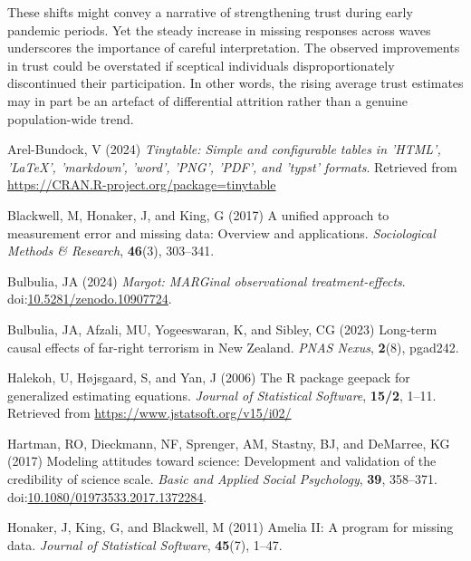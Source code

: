\documentclass[
  single column]{article}
\newlength{\cslhangindent}
\newenvironment{CSLReferences}[2] %
 {\begin{list}{}{%
  \setlength{\itemindent}{0pt}
  \setlength{\leftmargin}{0pt}
  \setlength{\parsep}{0pt}
  \ifodd #1
   \setlength{\leftmargin}{\cslhangindent}
   \setlength{\itemindent}{-1\cslhangindent}
  \fi
  \setlength{\itemsep}{#2\baselineskip}}}
 {\end{list}}
\begin{document}
These shifts might convey a narrative of strengthening trust during
early pandemic periods. Yet the steady increase in missing responses
across waves underscores the importance of careful interpretation. The
observed improvements in trust could be overstated if sceptical
individuals disproportionately discontinued their participation. In
other words, the rising average trust estimates may in part be an
artefact of differential attrition rather than a genuine population-wide
trend.

\newpage{}

\label{refs}
\begin{CSLReferences}{1}{0}
Arel-Bundock, V (2024) \emph{Tinytable: Simple and configurable tables
in 'HTML', 'LaTeX', 'markdown', 'word', 'PNG', 'PDF', and 'typst'
formats}. Retrieved from
\url{https://CRAN.R-project.org/package=tinytable}

Blackwell, M, Honaker, J, and King, G (2017) A unified approach to
measurement error and missing data: Overview and applications.
\emph{Sociological Methods \& Research}, \textbf{46}(3), 303--341.

Bulbulia, JA (2024) \emph{Margot: MARGinal observational
treatment-effects}.
doi:\href{https://doi.org/10.5281/zenodo.10907724}{10.5281/zenodo.10907724}.

Bulbulia, JA, Afzali, MU, Yogeeswaran, K, and Sibley, CG (2023)
Long-term causal effects of far-right terrorism in {N}ew {Z}ealand.
\emph{PNAS Nexus}, \textbf{2}(8), pgad242.

Halekoh, U, Højsgaard, S, and Yan, J (2006) The {R} package geepack for
generalized estimating equations. \emph{Journal of Statistical
Software}, \textbf{15/2}, 1--11. Retrieved from
\url{https://www.jstatsoft.org/v15/i02/}

Hartman, RO, Dieckmann, NF, Sprenger, AM, Stastny, BJ, and DeMarree, KG
(2017) Modeling attitudes toward science: Development and validation of
the credibility of science scale. \emph{Basic and Applied Social
Psychology}, \textbf{39}, 358--371.
doi:\href{https://doi.org/10.1080/01973533.2017.1372284}{10.1080/01973533.2017.1372284}.

Honaker, J, King, G, and Blackwell, M (2011) {Amelia II}: A program for
missing data. \emph{Journal of Statistical Software}, \textbf{45}(7),
1--47.


\end{CSLReferences}
\end{document}
